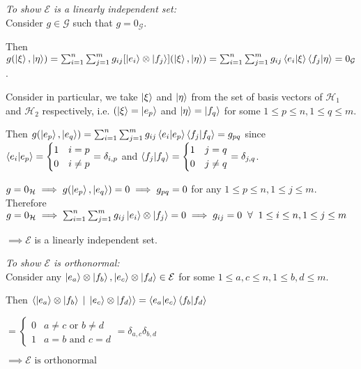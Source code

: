\documentclass[12pt,twoside,fleqn]{report}
\makeatletter
\theoremstyle{thmstyle}
\renewenvironment{proof}[1][\proofname]{\par
\pushQED{\qed}%
\normalfont \topsep6\p@\@plus6\p@\relax
\trivlist
\item[\hskip\labelsep\itshape#1\@addpunct{.}]\mbox{}\par\nobreak\ignorespaces
}{%
    \popQED\endtrivlist\@endpefalse
    }
\makeatother
\begin{document}
\begin{proof}
     \emph{To show $\mathcal{E}$ is a linearly independent set:} \\

     Consider $g \in \mathcal{G}$ such that $g = 0_\mathcal{G}$.

     Then $g(\ket\xi, \ket\eta) = \sum_{i=1}^n \sum_{j=1}^m g_{ij} [\ket{e_i} \otimes \ket{f_j}](\ket\xi, \ket\eta) = \sum_{i=1}^n \sum_{j=1}^m g_{ij} \braket{e_i|\xi} \braket{f_j|\eta} = 0_\mathcal{G}$.

     Consider in particular, we take $\ket\xi$ and $\ket\eta$ from the set of basis vectors of $\mathcal{H}_1$ and $\mathcal{H}_2$ respectively, i.e. $(\ket\xi = \ket{e_p}$ and $\ket\eta = \ket{f_q}$ for some $1 \leq p \leq n, 1 \leq q \leq m$.

     Then $g(\ket{e_p}, \ket{e_q}) = \sum_{i=1}^n \sum_{j=1}^m g_{ij} \braket{e_i|e_p} \braket{f_j|f_q} = g_{pq}$ since $\braket{e_i|e_p} = \begin{cases} 1 & i = p \\ 0 & i \neq p \end{cases} = \delta_{i,p}$
     and $\braket{f_j|f_q} = \begin{cases} 1 & j = q \\ 0 & j \neq q \end{cases} = \delta_{j,q}$.

         $g = 0_\mathcal{H} \implies g(\ket{e_p}, \ket{e_q}) = 0 \implies g_{pq} = 0$ for any $1 \leq p \leq n, 1 \leq j \leq m$.
         Therefore $g = 0_\mathcal{H} \implies  \sum_{i=1}^n \sum_{j=1}^m g_{ij} \ket{e_i} \otimes \ket{f_j} = 0 \implies g_{ij} = 0 \;\; \forall \;\; 1 \leq i \leq n, 1 \leq j \leq m$

         $\implies \mathcal{E}$ is a linearly independent set.

         \emph{To show $\mathcal{E}$ is orthonormal:} \\
         Consider any $\ket{e_a} \otimes \ket{f_b}, \ket{e_c} \otimes \ket{f_d} \in \mathcal{E}$ for some $1 \leq a,c \leq n, 1 \leq b,d \leq m$.

         Then $\braket{\ket{e_a} \otimes \ket{f_b} \; | \; \ket{e_c} \otimes \ket{f_d}} = \braket{e_a|e_c} \braket{f_b|f_d} $

         $ = \begin{cases} 0 & a \neq c \text{ or } b \neq d \\ 1 & a = b \text{ and } c = d \end{cases} = \delta_{a,c} \delta_{b,d}$

             $\implies \mathcal{E} \text{ is orthonormal}$ 
\end{proof}
\end{document}
